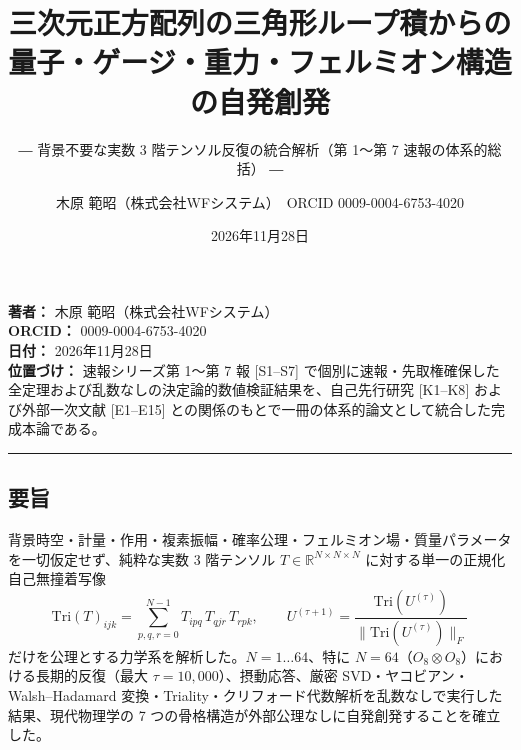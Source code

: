 \documentclass[
  a4paper,
]{ltjsarticle}
\title{三次元正方配列の三角形ループ積からの量子・ゲージ・重力・フェルミオン構造の自発創発}
\subtitle{― 背景不要な実数 3 階テンソル反復の統合解析（第 1〜第 7
速報の体系的総括） ―}
\author{木原 範昭（株式会社WFシステム）　ORCID 0009-0004-6753-4020}
\date{2026年11月28日}
\begin{document}
\maketitle

{
\setcounter{tocdepth}{2}
\tableofcontents
}
\textbf{著者：} 木原 範昭（株式会社WFシステム）\\
\textbf{ORCID：} 0009-0004-6753-4020\\
\textbf{日付：} 2026年11月28日\\
\textbf{位置づけ：} 速報シリーズ第 1〜第 7 報 {[}S1--S7{]}
で個別に速報・先取権確保した全定理および乱数なしの決定論的数値検証結果を、自己先行研究
{[}K1--K8{]} および外部一次文献 {[}E1--E15{]}
との関係のもとで一冊の体系的論文として統合した完成本論である。

\begin{center}\rule{0.5\linewidth}{0.5pt}\end{center}

\subsection{要旨}\label{ux8981ux65e8}

背景時空・計量・作用・複素振幅・確率公理・フェルミオン場・質量パラメータを一切仮定せず、純粋な実数
3 階テンソル \(T \in \mathbb{R}^{N\times N\times N}\)
に対する単一の正規化自己無撞着写像
\[\mathrm{Tri}(T)_{ijk} = \sum_{p,q,r=0}^{N-1} T_{ipq}\, T_{qjr}\, T_{rpk}, \qquad U^{(\tau+1)} = \frac{\mathrm{Tri}(U^{(\tau)})}{\|\mathrm{Tri}(U^{(\tau)})\|_F}\]
だけを公理とする力学系を解析した。\(N = 1 \dots 64\)、特に
\(N = 64\)（\(O_8 \otimes O_8\)）における長期的反復（最大
\(\tau = 10{,}000\)）、摂動応答、厳密 SVD・ヤコビアン・Walsh--Hadamard
変換・Triality・クリフォード代数解析を乱数なしで実行した結果、現代物理学の
7 つの骨格構造が外部公理なしに自発創発することを確立した。
\end{document}
